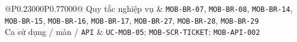 \begin{longtable}{@{}P{0.23000\SRSWidth}P{0.77000\SRSWidth}@{}}
Quy tắc nghiệp vụ & \texttt{MOB-\allowbreak{}BR-\allowbreak{}07}, \texttt{MOB-\allowbreak{}BR-\allowbreak{}08}, \texttt{MOB-\allowbreak{}BR-\allowbreak{}14}, \texttt{MOB-\allowbreak{}BR-\allowbreak{}15}, \texttt{MOB-\allowbreak{}BR-\allowbreak{}16}, \texttt{MOB-\allowbreak{}BR-\allowbreak{}17}, \texttt{MOB-\allowbreak{}BR-\allowbreak{}27}, \texttt{MOB-\allowbreak{}BR-\allowbreak{}28}, \texttt{MOB-\allowbreak{}BR-\allowbreak{}29} \\[3pt]
Ca sử dụng /\allowbreak{} màn /\allowbreak{} \texttt{API} & \texttt{UC-\allowbreak{}MOB-\allowbreak{}05}; \texttt{MOB-\allowbreak{}SCR-\allowbreak{}TICKET}; \texttt{MOB-\allowbreak{}API-\allowbreak{}002} \\[3pt]
\end{longtable}
\endgroup


